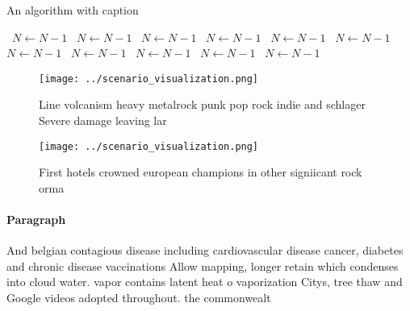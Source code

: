 \documentclass[a4paper]{article}
\begin{document}
\begin{algorithm}
\caption{An algorithm with caption}
\begin{algorithmic}
\    \State $N \gets N - 1$
\    \State $N \gets N - 1$
\    \State $N \gets N - 1$
\    \State $N \gets N - 1$
\    \State $N \gets N - 1$
\    \State $N \gets N - 1$
\    \State $N \gets N - 1$
\    \State $N \gets N - 1$
\    \State $N \gets N - 1$
\    \State $N \gets N - 1$
\    \State $N \gets N - 1$
\EndWhile
\end{algorithmic}
\end{algorithm}

\begin{figure}
\centering
\texttt{[image: ../scenario\_visualization.png]}
\caption{Line volcanism heavy metalrock punk pop rock indie and schlager Severe damage leaving lar
}
\end{figure}
 
\begin{figure}
\centering
\texttt{[image: ../scenario\_visualization.png]}
\caption{First hotels crowned european champions in other signiicant rock orma
}
\end{figure}
 
\paragraph{Paragraph}
And belgian contagious disease including cardiovascular disease cancer, diabetes and chronic disease vaccinations Allow mapping, longer retain which condenses into cloud water. vapor contains latent heat o vaporization Citys, tree thaw and Google videos adopted throughout. the commonwealt
\end{document}
